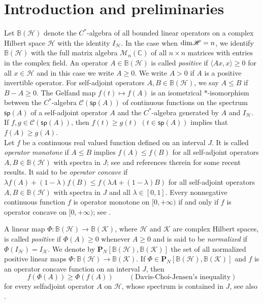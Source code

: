 \documentclass[12pt, reqno]{amsart}
\theoremstyle{definition}
\theoremstyle{remark}
\numberwithin{equation}{section}
\begin{document}
\section{Introduction and preliminaries}
Let ${\mathbb B}({\mathscr H})$ denote the $C^*$-algebra of all bounded linear operators on a complex Hilbert space ${\mathscr H}$ with the identity $I_{\mathscr H}$. In the case when ${\rm dim}{\mathscr{H}}=n$, we identify $\mathbb{B}(\mathscr{H})$ with the full matrix algebra $\mathcal{M}_n(\mathbb{C})$ of all $n\times n$ matrices with entries in the complex field. An operator $A\in{\mathbb B}({\mathscr H})$ is called \textit{positive} if $\langle Ax,x\rangle\geq0$ for all $x\in{\mathscr H }$  and in this case we write $A\geq0$. We write $A>0$ if $A$ is a positive invertible operator.  For self-adjoint operators $A, B\in{\mathbb B}({\mathscr H})$, we say $A\leq B$ if $B-A\geq0$. The Gelfand map $f(t)\mapsto f(A)$ is an isometrical $*$-isomorphism between the $C^*$-algebra
$\mathcal{C}({\textsf{sp}}(A))$ of continuous functions on the spectrum ${\textsf{sp}}(A)$ of a self-adjoint operator $A$ and the $C^*$-algebra generated by $A$ and  $I_{\mathscr H}$. If $f, g\in \mathcal{C}({\textsf{sp}}(A))$, then $f(t)\geq g(t)\,\,(t\in{\textsf{sp}}(A))$ implies that $f(A)\geq g(A)$.\\
Let $f$ be a continuous real valued function defined on an interval $J$. It is called \textit{operator monotone} if $A\leq B$ implies $f(A)\leq f(B)$ for all self-adjoint operators $A, B\in {\mathbb B}({\mathscr H})$ with spectra in $J$; see \cite{banach}  and references therein for some recent results. It said to be \textit{operator concave} if $\lambda f(A)+(1-\lambda)f(B)\leq f(\lambda A+(1-\lambda)B)$ for all self-adjoint operators $A, B\in {\mathbb B}({\mathscr H})$ with spectra in $J$ and all $\lambda\in [0,1]$. Every nonnegative continuous function $f$ is operator monotone on $[0,+\infty)$ if and only if $f$ is operator concave on $[0,+\infty)$; see \cite[Theorem 8.1]{FMPS}.

A linear map $\Phi:\mathbb{B}(\mathscr{H})\to\mathbb{B}(\mathscr{K})$, where $\mathscr{H}$ and $\mathscr{K}$ are complex Hilbert spaces, is called \textit{positive} if $\Phi(A)\geq 0$ whenever $A\geq 0$ and is said to be \textit{normalized} if $\Phi(I_\mathscr{H})=I_\mathscr{K}$. We denote by $\mathbf{P}_N[\mathbb{B}(\mathscr{H}),\mathbb{B}(\mathscr{K})]$ the set of all normalized positive linear maps $\Phi:\mathbb{B}(\mathscr{H})\to\mathbb{B}(\mathscr{K})$. If $\Phi \in \mathbf{P}_N[\mathbb{B}(\mathscr{H}),\mathbb{B}(\mathscr{K})]$ and $f$ is an operator concave function on an interval $J$, then
\begin{equation}\label{jen}
f(\Phi(A))\ge\Phi(f(A))\,\quad\quad(\mbox{Davis-Choi-Jensen's inequality})
\end{equation}
for every selfadjoint operator $A$ on $\mathscr{H}$, whose spectrum is contained in $J$, see also \cite{FMPS, MPP, IMP}.
\end{document}
